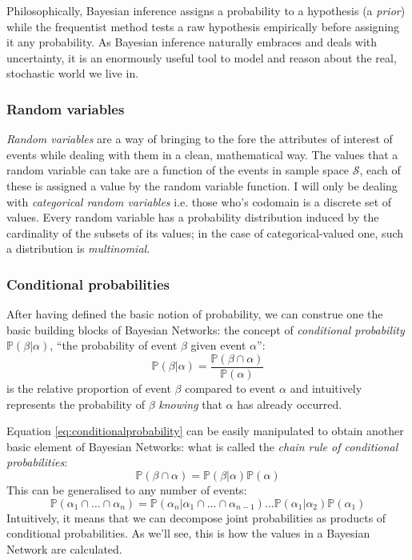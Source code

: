 Philosophically, Bayesian inference assigns a probability to a hypothesis (a \textit{prior}) while the frequentist method tests a raw hypothesis empirically before assigning it any probability.
As Bayesian inference naturally embraces and deals with uncertainty, it is an enormously useful tool to model and reason about the real, stochastic world we live in.

\subsubsection{Random variables}
\textit{Random variables} are a way of bringing to the fore the attributes of interest of events while dealing with them in a clean, mathematical way.
The values that a random variable can take are a function of the events in sample space $\mathcal{S}$, each of these is assigned a value by the random variable function.
I will only be dealing with \textit{categorical random variables} i.e. those who's codomain is a discrete set of values.
Every random variable has a probability distribution induced by the cardinality of the subsets of its values; in the case of categorical-valued one, such a distribution is \textit{multinomial}.

\subsubsection{Conditional probabilities}
After having defined the basic notion of probability, we can construe one the basic building blocks of Bayesian Networks: the concept of \textit{conditional probability} $\mathbb{P}(\beta|\alpha)$, ``the probability of event $\beta$ given event $\alpha$'':
\begin{equation} \label{eq:conditionalprobability}
\mathbb{P}(\beta|\alpha) = \frac{\mathbb{P}(\beta \cap \alpha)}{\mathbb{P}(\alpha)}
\end{equation}
is the relative proportion of event $\beta$ compared to event $\alpha$ and intuitively represents the probability of $\beta$ \textit{knowing} that $\alpha$ has already occurred.

Equation \ref{eq:conditionalprobability} can be easily manipulated to obtain another basic element of Bayesian Networks: what is called the \textit{chain rule of conditional probabilities}:
\begin{equation} \label{eq:chainrule}
	\mathbb{P}(\beta \cap \alpha) = \mathbb{P}(\beta|\alpha) \mathbb{P}(\alpha)
\end{equation}
This can be generalised to any number of events:
\begin{equation} \label{eq:chainrule}
	\mathbb{P}(\alpha_1 \cap \ldots \cap \alpha_n) = \mathbb{P}(\alpha_n | \alpha_1 \cap \ldots \cap \alpha_{n-1}) \ldots \mathbb{P}(\alpha_1 | \alpha_2 ) \mathbb{P}(\alpha_1) 
\end{equation}
Intuitively, it means that we can decompose joint probabilities as products of conditional probabilities.  
As we'll see, this is how the values in a Bayesian Network are calculated.

